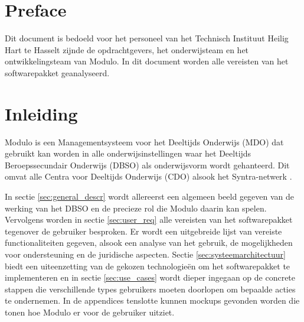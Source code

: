 \documentclass[a4paper]{article}
\begin{document}


\tableofcontents
\newpage

\section{Preface}
Dit document is bedoeld voor het personeel van het Technisch Instituut Heilig Hart te Hasselt \cite{TIHH} zijnde de opdrachtgevers, het onderwijsteam en het ontwikkelingsteam van Modulo. In dit document worden alle vereisten van het softwarepakket geanalyseerd.


\section{Inleiding}
Modulo is een Managementsysteem voor het Deeltijds Onderwijs (MDO) dat gebruikt kan worden in alle onderwijsinstellingen waar het Deeltijds Beroepssecundair Onderwijs (DBSO) \cite{DBSO} als onderwijsvorm wordt gehanteerd. Dit omvat alle Centra voor Deeltijds Onderwijs (CDO) \cite{CDO} alsook het Syntra-netwerk \cite{Syntra}.


In sectie \ref{sec:general_descr} wordt allereerst een algemeen beeld gegeven van de werking van het DBSO en de precieze rol die Modulo daarin kan spelen. Vervolgens worden in sectie \ref{sec:user_req} alle vereisten van het softwarepakket tegenover de gebruiker besproken. Er wordt een uitgebreide lijst van vereiste functionaliteiten gegeven, alsook een analyse van het gebruik, de mogelijkheden voor ondersteuning en de juridische aspecten. Sectie \ref{sec:systeemarchitectuur} biedt een uiteenzetting van de gekozen technologieën om het softwarepakket te implementeren en in sectie \ref{sec:use_cases} wordt dieper ingegaan op de concrete stappen die verschillende types gebruikers moeten doorlopen om bepaalde acties te ondernemen. In de appendices tenslotte kunnen mockups gevonden worden die tonen hoe Modulo er voor de gebruiker uitziet.
\end{document}
